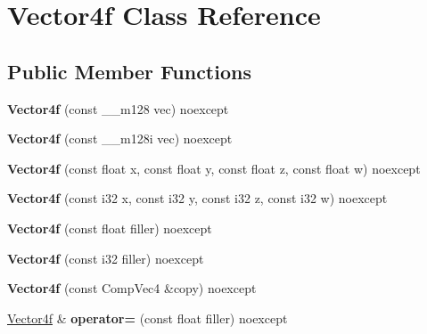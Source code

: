 \hypertarget{class_vector4f}{}\section{Vector4f Class Reference}
\label{class_vector4f}
\subsection*{Public Member Functions}
\begin{DoxyCompactItemize}
\item 
\mbox{\label{class_vector4f_a2625b62e405f1ccf29087438004590a1}} 
{\bfseries Vector4f} (const \+\_\+\+\_\+m128 vec) noexcept
\item 
\mbox{\label{class_vector4f_aa43c407ede567de68d5faa7d7df824d4}} 
{\bfseries Vector4f} (const \+\_\+\+\_\+m128i vec) noexcept
\item 
\mbox{\label{class_vector4f_ab3d46807898c66545f5981f8d7b47b64}} 
{\bfseries Vector4f} (const float x, const float y, const float z, const float w) noexcept
\item 
\mbox{\label{class_vector4f_af69823a39bd87a4e5f4ff6cfe200ca6e}} 
{\bfseries Vector4f} (const i32 x, const i32 y, const i32 z, const i32 w) noexcept
\item 
\mbox{\label{class_vector4f_a3209405ac744feb92f89d2bf5901a72d}} 
{\bfseries Vector4f} (const float filler) noexcept
\item 
\mbox{\label{class_vector4f_a8fd61b43ca07e37cc211801154e34042}} 
{\bfseries Vector4f} (const i32 filler) noexcept
\item 
\mbox{\label{class_vector4f_a56767887604e981ab69cd50f2e18817e}} 
{\bfseries Vector4f} (const Comp\+Vec4 \&copy) noexcept
\item 
\mbox{\label{class_vector4f_ab2db58718c956c50a6438cf6f6b5c3ab}} 
\mbox{\hyperlink{class_vector4f}{Vector4f}} \& {\bfseries operator=} (const float filler) noexcept
\item 
\mbox{\label{class_vector4f_a9b22b4673fc1a7a6d84eb14d16e5ce9c}} 

\end{DoxyCompactItemize}
